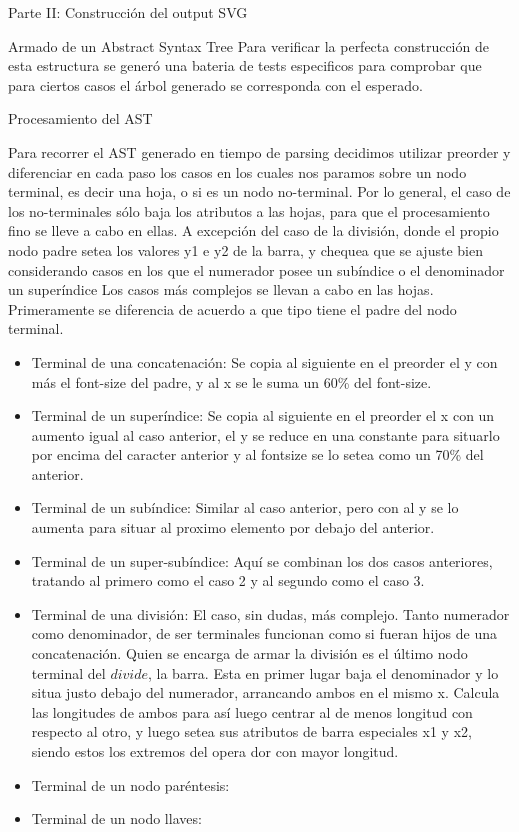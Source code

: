\begin{section}{Parte II: Construcci\'on del output SVG}
\begin{subsection}{Armado de un Abstract Syntax Tree}
Para verificar la perfecta construcci\'on de esta estructura se gener\'o una bateria de tests especificos para comprobar que para ciertos casos el \'arbol generado se corresponda con el esperado.

\end{subsection}

\begin{subsection}{Procesamiento del AST}

Para recorrer el AST generado en tiempo de parsing decidimos utilizar preorder y diferenciar en cada paso los casos en los cuales nos paramos sobre un nodo terminal, es decir una hoja, o si es un nodo no-terminal.
Por lo general, el caso de los no-terminales s\'olo baja los atributos a las hojas, para que el procesamiento fino se lleve a cabo en ellas. A excepci\'on del caso de la divisi\'on, donde el propio nodo padre setea los valores y1 e y2 de la barra, y chequea que se ajuste bien considerando casos en los que el numerador posee un sub\'indice o el denominador un super\'indice
Los casos m\'as complejos se llevan a cabo en las hojas. Primeramente se diferencia de acuerdo a que tipo tiene el padre del nodo terminal.

\begin{itemize}

\item Terminal de una concatenaci\'on: Se copia al siguiente en el preorder el y con m\'as el font-size del padre, y al x se le suma un 60\% del font-size.
\item Terminal de un super\'indice: Se copia al siguiente en el preorder el x con un aumento igual al caso anterior, el y se reduce en una constante para situarlo por encima del caracter anterior y al fontsize se lo setea como un 70\% del anterior.
\item Terminal de un sub\'indice: Similar al caso anterior, pero con al y se lo aumenta para situar al proximo elemento por debajo del anterior.
\item Terminal de un super-sub\'indice: Aqu\'i se combinan los dos casos anteriores, tratando al primero como el caso 2 y al segundo como el caso 3.
\item Terminal de una divisi\'on: El caso, sin dudas, m\'as complejo. Tanto numerador como denominador, de ser terminales funcionan como si fueran hijos de una concatenaci\'on. Quien se encarga de armar la divisi\'on es el \'ultimo nodo terminal del $divide$, la barra. Esta en primer lugar baja el denominador y lo situa justo debajo del numerador, arrancando ambos en el mismo x. Calcula las longitudes de ambos para as\'i luego centrar al de menos longitud con respecto al otro, y luego setea sus atributos de barra especiales x1 y x2, siendo estos los extremos del opera dor con mayor longitud. 
\item Terminal de un nodo par\'entesis: 
\item Terminal de un nodo llaves: 


\end{itemize}
\end{subsection}
\end{section}
